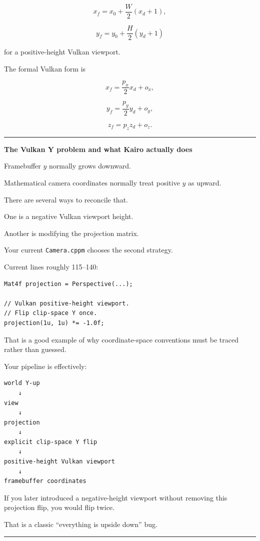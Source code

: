 \[
x_f=x_0+\frac{W}{2}(x_d+1),
\]

\[
y_f=y_0+\frac{H}{2}(y_d+1)
\]

for a positive-height Vulkan viewport.

The formal Vulkan form is

\[
x_f=\frac{p_x}{2}x_d+o_x,
\]

\[
y_f=\frac{p_y}{2}y_d+o_y,
\]

\[
z_f=p_z z_d+o_z.
\]

\begin{center}\rule{0.5\linewidth}{0.5pt}\end{center}

\textbf{The Vulkan Y problem and what Kairo actually does}

Framebuffer \(y\) normally grows downward.

Mathematical camera coordinates normally treat positive \(y\) as upward.

There are several ways to reconcile that.

One is a negative Vulkan viewport height.

Another is modifying the projection matrix.

Your current \texttt{Camera.cppm} chooses the second strategy.

Current lines roughly 115--140:

\begin{verbatim}
Mat4f projection = Perspective(...);

// Vulkan positive-height viewport.
// Flip clip-space Y once.
projection(1u, 1u) *= -1.0f;
\end{verbatim}

That is a good example of why coordinate-space conventions must be traced rather than guessed.

Your pipeline is effectively:

\begin{verbatim}
world Y-up
    ↓
view
    ↓
projection
    ↓
explicit clip-space Y flip
    ↓
positive-height Vulkan viewport
    ↓
framebuffer coordinates
\end{verbatim}

If you later introduced a negative-height viewport without removing this projection flip, you would flip twice.

That is a classic ``everything is upside down'' bug.

\begin{center}\rule{0.5\linewidth}{0.5pt}\end{center}

